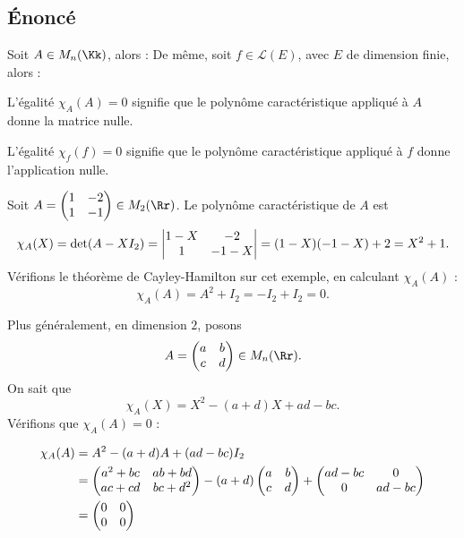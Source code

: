 \documentclass[12pt, class=report,crop=false]{standalone}
\begin{document}
\subsection{Énoncé}


\begin{theoreme}
\label{th:cayley-hamilton}
Soit $A \in M_n(\Kk)$, alors :
De même, soit $f \in \mathcal{L}(E)$, avec $E$  de dimension finie, alors :
\end{theoreme}

L'égalité $\chi_A(A) = 0$ signifie que le polynôme caractéristique appliqué à $A$ donne la matrice nulle.

L'égalité $\chi_f(f) = 0$ signifie que le polynôme caractéristique appliqué à $f$ donne l'application nulle.

\begin{exemple}
Soit $A=\begin{pmatrix}1&-2\cr1&-1\end{pmatrix}\in M_2(\Rr)$.
Le polynôme caractéristique de $A$ est 
$$\chi_A(X)=\det(A-X I_2) = \begin{vmatrix}1-X&-2\cr 1&-1-X\end{vmatrix}=(1-X)(-1-X)+2=X^2+1.$$
Vérifions le théorème de Cayley-Hamilton sur cet exemple, en calculant $\chi_A(A)$ :
$$\chi_A(A) = A^2+I_2 = -I_2 + I_2 = 0.$$ 
\end{exemple}


\begin{exemple}
Plus généralement, en dimension $2$, posons 
$$A=\left(\begin{matrix}a&b\cr c&d\end{matrix}\right)\in M_n(\Rr).$$ 
On sait que  
$$\chi_A(X) = X^2-(a+d)X+ad-bc.$$
Vérifions que $\chi_A(A) = 0$ :

\begin{align*}
\chi_A(A)
  &=A^2-(a+d)A+(ad-bc)I_2 \\
  &=\begin{pmatrix}a^2+bc&ab+bd\cr ac+cd&bc+d^2\end{pmatrix}-
(a+d)\begin{pmatrix}a&b\cr c&d\end{pmatrix}+\begin{pmatrix}ad-bc&0\cr 0&ad-bc\end{pmatrix} \\
  &= \begin{pmatrix}0&0\cr 0&0\end{pmatrix}
\end{align*}
\end{exemple} 
\end{document}
